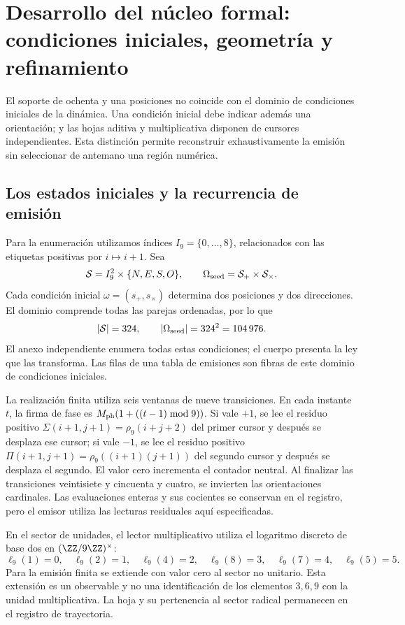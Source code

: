 \section{Desarrollo del núcleo formal: condiciones iniciales, geometría y refinamiento}
\label{sec:extension}

El soporte de ochenta y una posiciones no coincide con el dominio de condiciones iniciales de la dinámica. Una condición inicial debe indicar además una orientación; y las hojas aditiva y multiplicativa disponen de cursores independientes. Esta distinción permite reconstruir exhaustivamente la emisión sin seleccionar de antemano una región numérica.

\subsection{Los estados iniciales y la recurrencia de emisión}

Para la enumeración utilizamos índices \(I_9=\{0,\ldots,8\}\), relacionados con las etiquetas positivas por \(i\mapsto i+1\). Sea
\[
 \mathcal S=I_9^2\times\{N,E,S,O\},\qquad
 \Omega_{\rm seed}=\mathcal S_+\times\mathcal S_\times.
\]
Cada condición inicial \(\omega=(s_+,s_\times)\) determina dos posiciones y dos direcciones. El dominio comprende todas las parejas ordenadas, por lo que
\begin{equation}
 |\mathcal S|=324,\qquad |\Omega_{\rm seed}|=324^2=104\,976.
 \label{eq:semillas}
\end{equation}
El anexo independiente enumera todas estas condiciones; el cuerpo presenta la ley que las transforma. Las filas de una tabla de emisiones son fibras de este dominio de condiciones iniciales.

La realización finita utiliza seis ventanas de nueve transiciones. En cada instante \(t\), la firma de fase es \(M_{\rm ph}(1+((t-1)\bmod9))\). Si vale \(+1\), se lee el residuo positivo \(\Sigma(i+1,j+1)=\rho_9(i+j+2)\) del primer cursor y después se desplaza ese cursor; si vale \(-1\), se lee el residuo positivo \(\Pi(i+1,j+1)=\rho_9((i+1)(j+1))\) del segundo cursor y después se desplaza el segundo. El valor cero incrementa el contador neutral. Al finalizar las transiciones veintisiete y cincuenta y cuatro, se invierten las orientaciones cardinales. Las evaluaciones enteras y sus cocientes se conservan en el registro, pero el emisor utiliza las lecturas residuales aquí especificadas.

En el sector de unidades, el lector multiplicativo utiliza el logaritmo discreto de base dos en \((\ZZ/9\ZZ)^\times\):
\[
 \ell_9(1)=0,\quad\ell_9(2)=1,\quad\ell_9(4)=2,\quad
 \ell_9(8)=3,\quad\ell_9(7)=4,\quad\ell_9(5)=5.
\]
Para la emisión finita se extiende con valor cero al sector no unitario. Esta extensión es un observable y no una identificación de los elementos \(3,6,9\) con la unidad multiplicativa. La hoja y su pertenencia al sector radical permanecen en el registro de trayectoria.

